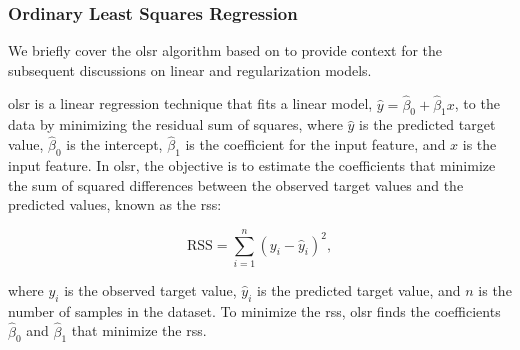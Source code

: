 \subsubsection{Ordinary Least Squares Regression}\label{sec:ols}
We briefly cover the \gls{olsr} algorithm based on \citet{James2023AnIS} to provide context for the subsequent discussions on linear and regularization models.

\gls{olsr} is a linear regression technique that fits a linear model, $\hat{y} = \hat{\beta}_0 + \hat{\beta}_1 x$, to the data by minimizing the residual sum of squares, where $\hat{y}$ is the predicted target value, $\hat{\beta}_0$ is the intercept, $\hat{\beta}_1$ is the coefficient for the input feature, and $x$ is the input feature.
In \gls{olsr}, the objective is to estimate the coefficients that minimize the sum of squared differences between the observed target values and the predicted values, known as the \gls{rss}:

$$
\text{RSS} = \sum_{i=1}^{n} (y_i - \hat{y}_i)^2,
$$

where $y_i$ is the observed target value, $\hat{y}_i$ is the predicted target value, and $n$ is the number of samples in the dataset.
To minimize the \gls{rss}, \gls{olsr} finds the coefficients $\hat{\beta}_0$ and $\hat{\beta}_1$ that minimize the \gls{rss}.